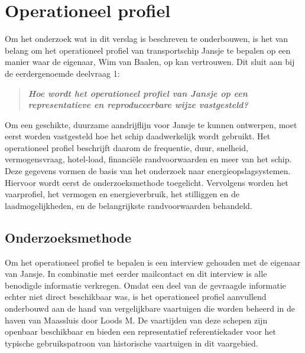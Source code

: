 \chapter{Operationeel profiel}


Om het onderzoek wat in dit verslag is beschreven te onderbouwen, is het van belang om het operationeel profiel van transportschip Jansje te bepalen op een manier waar de eigenaar, Wim van Baalen, op kan vertrouwen. Dit sluit aan bij de eerdergenoemde deelvraag 1:

\begin{quote}
    \textit{\textbf{Hoe wordt het operationeel profiel van Jansje op een representatieve en 
    reproduceerbare wijze vastgesteld?}}
\end{quote}

\noindent Om een geschikte, duurzame aandrijflijn voor Jansje te kunnen ontwerpen, moet eerst worden vastgesteld hoe het schip daadwerkelijk wordt gebruikt. Het operationeel profiel beschrijft daarom de frequentie, duur, snelheid, vermogensvraag, hotel-load, financiële randvoorwaarden en meer van het schip. Deze gegevens vormen de basis van het onderzoek naar energieopslagsystemen. Hiervoor wordt eerst de onderzoeksmethode toegelicht. Vervolgens worden het vaarprofiel, het vermogen en energieverbruik, het stilliggen en de laadmogelijkheden, en de belangrijkste randvoorwaarden behandeld.


\section{Onderzoeksmethode}

Om het operationeel profiel te bepalen is een interview gehouden met de eigenaar van Jansje. In combinatie met eerder mailcontact en dit interview is alle benodigde informatie verkregen. Omdat een deel van de gevraagde informatie echter niet direct beschikbaar was, is het operationeel profiel aanvullend onderbouwd aan de hand van vergelijkbare vaartuigen die worden beheerd in de haven van Maassluis door Loods M. De vaartijden van deze schepen zijn openbaar beschikbaar en bieden een representatief referentiekader voor het typische gebruikspatroon van historische vaartuigen in dit vaargebied.

